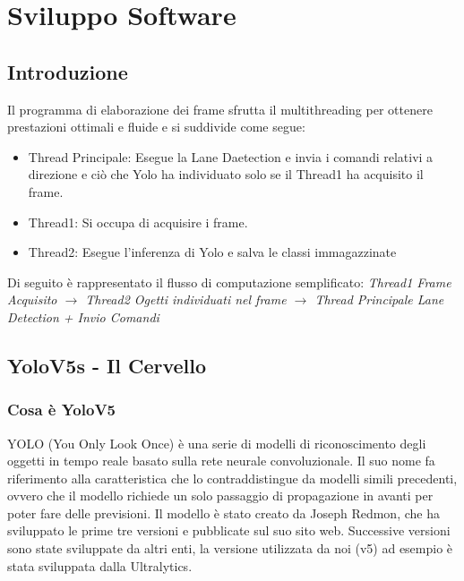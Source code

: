 \documentclass{article}
\begin{document}
\section{Sviluppo Software}
\subsection{Introduzione}
Il programma di elaborazione dei frame sfrutta il \cite{multithreading} multithreading per ottenere prestazioni ottimali e fluide e si suddivide come segue:

\begin{itemize}
    \item Thread Principale: Esegue la Lane Daetection e invia i comandi relativi a direzione e ciò che Yolo ha individuato solo se il Thread1 ha acquisito il frame.
    \item Thread1: Si occupa di acquisire i frame. 
    \item Thread2: Esegue l'inferenza di Yolo e salva le classi immagazzinate
\end{itemize} 

Di seguito è rappresentato il flusso di computazione semplificato:
\textit{Thread1 Frame Acquisito  $\rightarrow$ Thread2 Ogetti individuati nel frame $\rightarrow$ Thread Principale Lane Detection + Invio Comandi}  


\subsection{YoloV5s - Il Cervello}
    
    \subsubsection{Cosa è YoloV5}
    \cite{yolov5arch}
    YOLO (You Only Look Once) è una serie di modelli di riconoscimento degli oggetti in tempo reale basato sulla rete neurale convoluzionale. Il suo nome fa riferimento alla caratteristica che lo contraddistingue da modelli simili precedenti, ovvero che il modello richiede un solo passaggio di propagazione in avanti per poter fare delle previsioni.
    Il modello è stato creato da Joseph Redmon, che ha sviluppato le prime tre versioni e pubblicate sul suo sito web. Successive versioni sono state sviluppate da altri enti, la versione utilizzata da noi (v5) ad esempio è stata sviluppata dalla Ultralytics.
    
\end{document}
